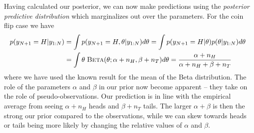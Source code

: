 Having calculated our posterior, we can now make
predictions using the \emph{posterior predictive distribution} which marginalizes out over
the parameters.  For the coin flip case we have
\begin{align}
\label{eq:bayes:post-pred}
p( y_{N+1}=H | y_{1:N}) &= \int p(y_{N+1}=H, \theta | y_{1:N}) d\theta
= \int p(y_{N+1}=H | \theta) p(\theta | y_{1:N})  d\theta \nonumber \\
&= \int  \theta \; \textsc{Beta}(\theta ; \alpha+n_H, \beta+n_T) d\theta 
=\frac{\alpha+n_H}{\alpha+n_H+\beta+n_T}
\end{align}
where we have used the known result for the mean of the Beta distribution.
The role of the parameters $\alpha$ and $\beta$ in our prior now become apparent
-- they take on the role of pseudo-observations.  Our prediction is in line with the
empirical average from seeing $\alpha+n_H$ heads and $\beta+n_T$ tails.  The larger
$\alpha+\beta$ is then the strong our prior compared to the observations, while we
can skew towards heads or tails being more likely by changing the relative values of $\alpha$
and $\beta$.

